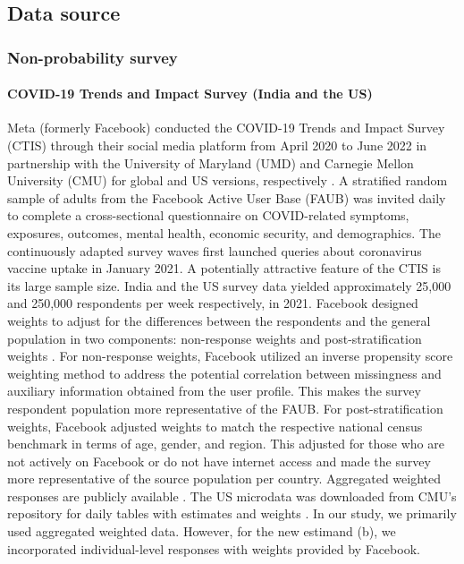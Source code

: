 \documentclass{article}
\begin{document}
\subsection{Data source}

\subsubsection{Non-probability survey}

\paragraph{COVID-19 Trends and Impact Survey (India and the US)} Meta (formerly Facebook) conducted the COVID-19 Trends and Impact Survey (CTIS) through their social media platform from April 2020 to June 2022 in partnership with the University of Maryland (UMD) and Carnegie Mellon University (CMU) for global and US versions, respectively \citep{Astley2021-aq, Salomon2021-xe}. A stratified random sample of adults from the Facebook Active User Base (FAUB) was invited daily to complete a cross-sectional questionnaire on COVID-related symptoms, exposures, outcomes, mental health, economic security, and demographics. The continuously adapted survey waves first launched queries about coronavirus vaccine uptake in January 2021. A potentially attractive feature of the CTIS is its large sample size. India and the US survey data yielded approximately 25,000 and 250,000 respondents per week respectively, in 2021. Facebook designed weights to adjust for the differences between the respondents and the general population in two components: non-response weights and post-stratification weights \citep{Barkay2020}. For non-response weights, Facebook utilized an inverse propensity score weighting method to address the potential correlation between missingness and auxiliary information obtained from the user profile. This makes the survey respondent population more representative of the FAUB. For post-stratification weights, Facebook adjusted weights to match the respective national census benchmark in terms of age, gender, and region. This adjusted for those who are not actively on Facebook or do not have internet access and made the survey more representative of the source population per country. Aggregated weighted responses are publicly available \citep{Fan2020, Reinhart2021-yh}. The US microdata was downloaded from CMU's repository for daily tables with estimates and weights \citep{Reinhart2021-yh}. In our study, we primarily used aggregated weighted data. However, for the new estimand (b), we incorporated individual-level responses with weights provided by Facebook.
\end{document}
